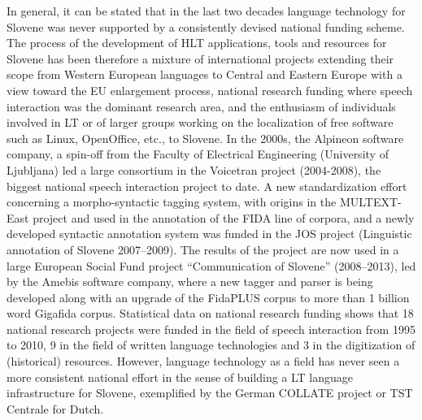 \documentclass[10pt, plain]{../../metanetpaper}
\begin{document}
\begin{multicols}{2}
\begin{small}
In general, it can be stated that in the last two decades language technology for Slovene was never supported by a consistently devised national funding scheme. The process of the development of HLT applications, tools and resources for Slovene has been therefore a mixture of international projects extending their scope from Western European languages to Central and Eastern Europe with a view toward the EU enlargement process, national research funding where speech interaction was the dominant research area, and the enthusiasm of individuals involved in LT or of larger groups working on the localization of free software such as Linux, OpenOffice, etc., to Slovene.  In the 2000s, the Alpineon software company, a spin-off from the Faculty of Electrical Engineering (University of Ljubljana) led a large consortium in the Voicetran project (2004-2008), the biggest national speech interaction project to date.  A new standardization effort concerning a morpho-syntactic tagging system, with origins in the MULTEXT-East project and used in the annotation of the FIDA line of corpora, and a newly developed syntactic annotation system was funded in the JOS project (Linguistic annotation of Slovene 2007--2009). The results of the project are now used in a large European Social Fund project “Communication of Slovene” (2008--2013), led by the Amebis software company, where a new tagger and parser is being developed along with an upgrade of the FidaPLUS corpus to more than 1 billion word Gigafida corpus.  Statistical data on national research funding shows that 18 national research projects were funded in the field of speech interaction from 1995 to 2010, 9 in the field of written language technologies and 3 in the digitization of (historical) resources. However, language technology as a field has never seen a more consistent national effort in the sense of building a LT language infrastructure for Slovene, exemplified by the German COLLATE project or TST Centrale for Dutch.

%

%
\end{small}

\end{multicols}


\makespine
\end{document}
